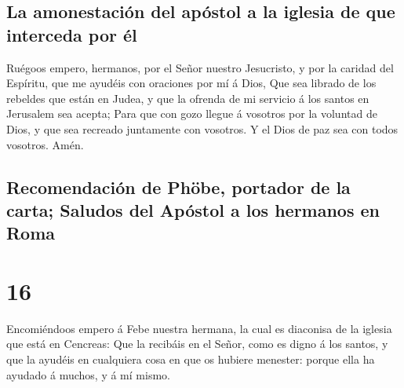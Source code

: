 \hypertarget{la-amonestaciuxf3n-del-apuxf3stol-a-la-iglesia-de-que-interceda-por-uxe9l}{%
\subsection{La amonestación del apóstol a la iglesia de que interceda
por
él}\label{la-amonestaciuxf3n-del-apuxf3stol-a-la-iglesia-de-que-interceda-por-uxe9l}}

 Ruégoos empero, hermanos, por el Señor nuestro
Jesucristo, y por la caridad del Espíritu, que me ayudéis con oraciones
por mí á Dios,  Que sea librado de los rebeldes que están
en Judea, y que la ofrenda de mi servicio á los santos en Jerusalem sea
acepta;  Para que con gozo llegue á vosotros por la
voluntad de Dios, y que sea recreado juntamente con vosotros.
 Y el Dios de paz sea con todos vosotros. Amén.

\hypertarget{recomendaciuxf3n-de-phuxf6be-portador-de-la-carta-saludos-del-apuxf3stol-a-los-hermanos-en-roma}{%
\subsection{Recomendación de Phöbe, portador de la carta; Saludos del
Apóstol a los hermanos en
Roma}\label{recomendaciuxf3n-de-phuxf6be-portador-de-la-carta-saludos-del-apuxf3stol-a-los-hermanos-en-roma}}

\hypertarget{section-15}{%
\section{16}\label{section-15}}

 Encomiéndoos empero á Febe nuestra hermana, la cual es
diaconisa de la iglesia que está en Cencreas:  Que la
recibáis en el Señor, como es digno á los santos, y que la ayudéis en
cualquiera cosa en que os hubiere menester: porque ella ha ayudado á
muchos, y á mí mismo.

